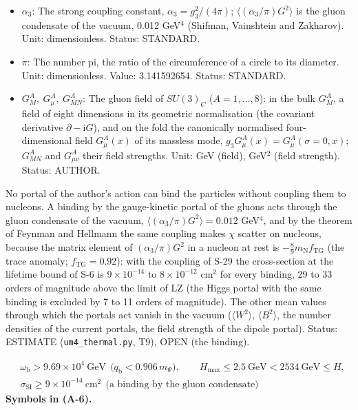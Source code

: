 \documentclass[
  10pt,
]{article}
\begin{document}
\begin{itemize}
  \(-\frac89m_{\mathrm{N}}f_{\mathrm{TG}}\). Unit: dimensionless. Value:
  0.92. Status: STANDARD.
\item
  \(\alpha_3\): The strong coupling constant,
  \(\alpha_3 = g_3^2/(4\pi)\); \(\langle(\alpha_3/\pi)G^2\rangle\) is
  the gluon condensate of the vacuum, 0.012 GeV\(^4\) (Shifman,
  Vainshtein and Zakharov). Unit: dimensionless. Status: STANDARD.
\item
  \(\pi\): The number pi, the ratio of the circumference of a circle to
  its diameter. Unit: dimensionless. Value: 3.141592654. Status:
  STANDARD.
\item
  \(G^A_M,\ G^A_\mu,\ G^A_{MN}\): The gluon field of \(SU(3)_C\)
  (\(A = 1, \dots, 8\)): in the bulk \(G^A_M\), a field of eight
  dimensions in its geometric normalisation (the covariant derivative
  \(\partial - \mathrm{i}G\)), and on the fold the canonically
  normalised four-dimensional field \(G^A_\mu(x)\) of its massless mode,
  \(g_3G^A_\mu(x) = G^A_\mu(\sigma = 0, x)\); \(G^A_{MN}\) and
  \(G^A_{\mu\nu}\) their field strengths. Unit: GeV (field), GeV\(^2\)
  (field strength). Status: AUTHOR.
\end{itemize}

No portal of the author's action can bind the particles without coupling
them to nucleons. A binding by the gauge-kinetic portal of the gluons
acts through the gluon condensate of the vacuum,
\(\langle(\alpha_3/\pi)G^2\rangle = 0.012\) GeV\(^4\), and by the
theorem of Feynman and Hellmann the same coupling makes \(\chi\) scatter
on nucleons, because the matrix element of \((\alpha_3/\pi)G^2\) in a
nucleon at rest is \(-\frac89m_{\mathrm{N}}f_{\mathrm{TG}}\) (the trace
anomaly; \(f_{\mathrm{TG}} = 0.92\)): with the coupling of S-29 the
cross-section at the lifetime bound of S-6 is \(9\times10^{-14}\) to
\(8\times10^{-12}\) cm\(^2\) for every binding, 29 to 33 orders of
magnitude above the limit of LZ (the Higgs portal with the same binding
is excluded by 7 to 11 orders of magnitude). The other mean values
through which the portals act vanish in the vacuum
(\(\langle W^2\rangle\), \(\langle B^2\rangle\), the number densities of
the current portals, the field strength of the dipole portal). Status:
ESTIMATE (\texttt{um4\_thermal.py}, T9), OPEN (the binding).

\[
\begin{aligned}
&\omega_{\mathrm{b}} > 9.69\times10^4\ \text{GeV}\ \ \big(q_{\mathrm{b}} < 0.906\,m_\Psi\big),\qquad
H_{\max} \le 2.5\ \text{GeV} < 2534\ \text{GeV} \le H,\\
&\sigma_{\mathrm{SI}} \ge 9\times10^{-14}\ \text{cm}^2\ \ \big(\text{a binding by the gluon condensate}\big)
\end{aligned} \tag{A-6}
\] \textbf{Symbols in (A-6).}
\end{document}
